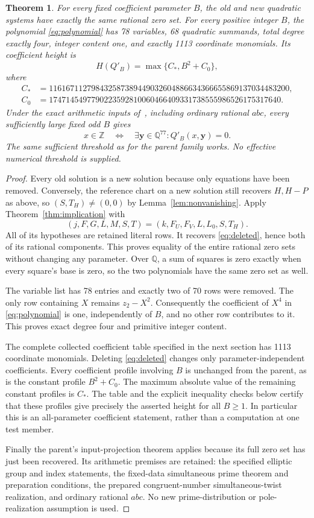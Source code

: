 \documentclass[11pt,a4paper]{article}
\newtheorem{theorem}{Theorem}[section]
\theoremstyle{remark}\newtheorem{remark}[theorem]{Remark}
\newcommand{\Q}{\mathbb Q}\newcommand{\Z}{\mathbb Z}
\begin{document}
\begin{theorem}\label{thm:quartic}
For every fixed coefficient parameter $B$, the old and new quadratic
systems have exactly the same rational zero set. For every positive
integer $B$, the polynomial \eqref{eq:polynomial} has 78 variables,
68 quadratic summands, total degree exactly four, integer content one,
and exactly 1113 coordinate monomials. Its coefficient height is
\[
 H(Q'_B)=\max\{C_*,B^2+C_0\},
\]
where
\begin{align*}
 C_*&=116167112798432587389449032604886634366655869137034483200,\\
 C_0&=1747145497790223592810060466409331738555986526175317640.
\end{align*}
Under the exact arithmetic inputs of~\cite{ABC78}, including ordinary
rational $abc$, every sufficiently large fixed odd $B$ gives
\[
 x\in\Z\quad\Longleftrightarrow\quad
       \exists\boldsymbol y\in\Q^{77}:Q'_B(x,\boldsymbol y)=0.
\]
The same sufficient threshold as for the parent family works.
No effective numerical threshold is supplied.
\end{theorem}
\begin{proof}
Every old solution is a new solution because only equations have been
removed. Conversely, the reference chart on a new solution still
recovers $H,H-P$ as above, so $(S,T_H)\ne(0,0)$ by
Lemma~\ref{lem:nonvanishing}. Apply Theorem~\ref{thm:implication} with
\[
 (j,F,G,L,M,S,T)=(k,F_U,F_V,L,L_0,S,T_H).
\]
All of its hypotheses are retained literal rows. It recovers
\eqref{eq:deleted}, hence both of its rational components. This proves
equality of the entire rational zero sets without changing any parameter.
Over $\Q$, a sum of squares is zero exactly when every square's base
is zero, so the two polynomials have the same zero set as well.

The variable list has 78 entries and exactly two of 70 rows were removed.
The only row containing $X$ remains $z_2-X^2$. Consequently the
coefficient of $X^4$ in \eqref{eq:polynomial} is one, independently of
$B$, and no other row contributes to it. This proves exact degree four
and primitive integer content.

The complete collected coefficient table specified in the next section
has 1113 coordinate monomials. Deleting \eqref{eq:deleted} changes only
parameter-independent coefficients. Every coefficient profile involving
$B$ is unchanged from the parent, as is the constant profile $B^2+C_0$.
The maximum absolute value of the remaining constant profiles is $C_*$.
The table and the explicit inequality checks below certify that these
profiles give precisely the asserted height for all $B\ge1$.
In particular this is an all-parameter coefficient statement, rather
than a computation at one test member.

Finally the parent's input-projection theorem applies because its full
zero set has just been recovered. Its arithmetic premises are retained:
the specified elliptic group and index statements, the fixed-data
simultaneous prime theorem and preparation conditions, the prepared
congruent-number simultaneous-twist realization, and ordinary rational
$abc$. No new prime-distribution or pole-realization assumption is used.
\end{proof}
\end{document}
